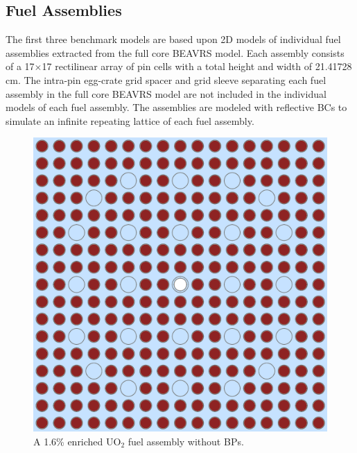 


\subsection{Fuel Assemblies}
\label{subsec:chap7-fuel-assms}


The first three benchmark models are based upon 2D models of individual fuel assemblies extracted from the full core \ac{BEAVRS} model. Each assembly consists of a 17$\times$17 rectilinear array of pin cells with a total height and width of 21.41728 cm. The intra-pin egg-crate grid spacer and grid sleeve separating each fuel assembly in the full core \ac{BEAVRS} model are not included in the individual models of each fuel assembly. The assemblies are modeled with reflective \acp{BC} to simulate an infinite repeating lattice of each fuel assembly. 

\begin{figure}[h!]
  \centering
  \includegraphics[width=0.65\linewidth]{figures/benchmarks/assembly-16}
\vspace{2mm}
\caption[BEAVRS 1.6\% enriched assembly]{A 1.6\% enriched UO$_2$ fuel assembly without \acp{BP}.}
\label{fig:chap7-assm-16}
\end{figure}


